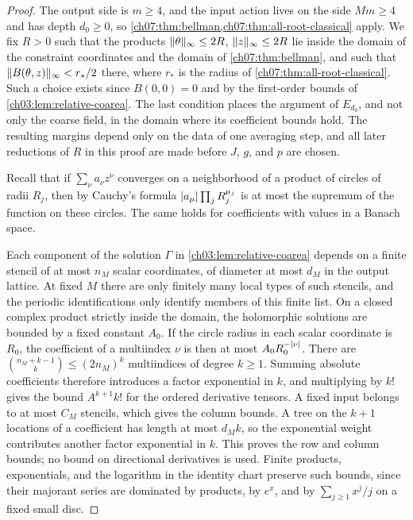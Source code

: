 \begin{proof}
The output side is $m\ge4$, and the input action lives on the side $Mm\ge4$ and has depth $d_0\ge0$, so \cref{ch07:thm:bellman,ch07:thm:all-root-classical} apply. We fix $R>0$ such that the products $\lVert \theta\rVert_\infty\le2R$, $\lVert z\rVert_\infty\le2R$ lie inside the domain of the constraint coordinates and the domain of \cref{ch07:thm:bellman}, and such that $\lVert B(\theta,z)\rVert_\infty<r_*/2$ there, where $r_*$ is the radius of \cref{ch07:thm:all-root-classical}. Such a choice exists since $B(0,0)=0$ and by the first-order bounds of \cref{ch03:lem:relative-coarea}. The last condition places the argument of $E_{d_0}$, and not only the coarse field, in the domain where its coefficient bounds hold. The resulting margins depend only on the data of one averaging step, and all later reductions of $R$ in this proof are made before $J$, $g$, and $p$ are chosen.

Recall that if $\sum_\nu a_\nu z^\nu$ converges on a neighborhood of a product of circles of radii $R_j$, then by Cauchy's formula $\lvert a_\mu\rvert\prod_jR_j^{\mu_j}$ is at most the supremum of the function on these circles. The same holds for coefficients with values in a Banach space.

Each component of the solution $\Gamma$ in \cref{ch03:lem:relative-coarea} depends on a finite stencil of at most $n_M$ scalar coordinates, of diameter at most $d_M$ in the output lattice. At fixed $M$ there are only finitely many local types of such stencils, and the periodic identifications only identify members of this finite list. On a closed complex product strictly inside the domain, the holomorphic solutions are bounded by a fixed constant $A_0$. If the circle radius in each scalar coordinate is $R_0$, the coefficient of a multiindex $\nu$ is then at most $A_0R_0^{-\lvert \nu\rvert}$. There are $\binom{n_M+k-1}{k}\le(2n_M)^k$ multiindices of degree $k\ge1$. Summing absolute coefficients therefore introduces a factor exponential in $k$, and multiplying by $k!$ gives the bound $A^{k+1}k!$ for the ordered derivative tensors. A fixed input belongs to at most $C_M$ stencils, which gives the column bounds. A tree on the $k+1$ locations of a coefficient has length at most $d_Mk$, so the exponential weight contributes another factor exponential in $k$. This proves the row and column bounds; no bound on directional derivatives is used. Finite products, exponentials, and the logarithm in the identity chart preserve such bounds, since their majorant series are dominated by products, by $e^x$, and by $\sum_{j\ge1}x^j/j$ on a fixed small disc.


\end{proof}
